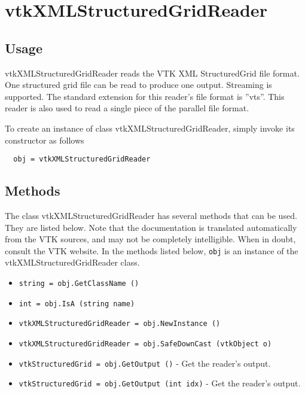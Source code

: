 \section{vtkXMLStructuredGridReader}

\subsection{Usage}

 vtkXMLStructuredGridReader reads the VTK XML StructuredGrid file
 format.  One structured grid file can be read to produce one
 output.  Streaming is supported.  The standard extension for this
 reader's file format is ''vts''.  This reader is also used to read a
 single piece of the parallel file format.

To create an instance of class vtkXMLStructuredGridReader, simply
invoke its constructor as follows
\begin{verbatim}
  obj = vtkXMLStructuredGridReader
\end{verbatim}
\subsection{Methods}

The class vtkXMLStructuredGridReader has several methods that can be used.
  They are listed below.
Note that the documentation is translated automatically from the VTK sources,
and may not be completely intelligible.  When in doubt, consult the VTK website.
In the methods listed below, \verb|obj| is an instance of the vtkXMLStructuredGridReader class.
\begin{itemize}
\item  \verb|string = obj.GetClassName ()|

\item  \verb|int = obj.IsA (string name)|

\item  \verb|vtkXMLStructuredGridReader = obj.NewInstance ()|

\item  \verb|vtkXMLStructuredGridReader = obj.SafeDownCast (vtkObject o)|

\item  \verb|vtkStructuredGrid = obj.GetOutput ()| -  Get the reader's output.

\item  \verb|vtkStructuredGrid = obj.GetOutput (int idx)| -  Get the reader's output.

\end{itemize}
